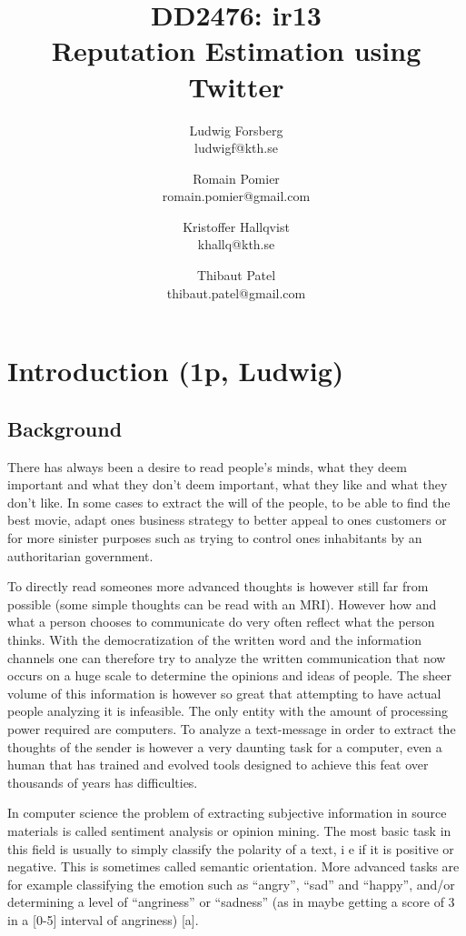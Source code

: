\documentclass[a4paper,11pt]{report}
\title{\TitleFontTwo DD2476: ir13 \\ \TitleFont Reputation Estimation using Twitter}
\author{Ludwig Forsberg \\ ludwigf@kth.se \and Romain Pomier \\  romain.pomier@gmail.com \and Kristoffer Hallqvist \\ khallq@kth.se \and Thibaut Patel \\ thibaut.patel@gmail.com}
\begin{document}
\maketitle
\clearpage

\abstract{
}

\tableofcontents

\clearpage
\chapter{Introduction (1p, Ludwig)}

\section{Background}

There has always been a desire to read people's minds, what they deem important and what they don't deem important, what they like and what they don't like. 
In some cases to extract the will of the people, to be able to find the best movie, adapt ones business strategy to better appeal to ones customers or for more sinister purposes such as trying to control ones inhabitants by an authoritarian government.

To directly read someones more advanced thoughts is however still far from possible (some simple thoughts can be read with an MRI). 
However how and what a person chooses to communicate do very often reflect what the person thinks. With the democratization of the written word and the information channels one can therefore try to analyze the written communication that now occurs on a huge scale to determine the opinions and ideas of people. 
The sheer volume of this information is however so great that attempting to have actual people analyzing it is infeasible. 
The only entity with the amount of processing power required are computers. 
To analyze a text-message in order to extract the thoughts of the sender is however a very daunting task for a computer, even a human that has trained and evolved tools designed to achieve this feat over thousands of years has difficulties.

In computer science the problem of extracting subjective information in source materials is called sentiment analysis or opinion mining. 
The most basic task in this field is usually to simply classify the polarity of a text, i e if it is positive or negative. 
This is sometimes called semantic orientation. 
More advanced tasks are for example classifying the emotion such as “angry”, “sad” and “happy”, and/or determining a level of “angriness” or “sadness” (as in maybe getting a score of 3 in a [0-5] interval of angriness) [a].
\end{document}
